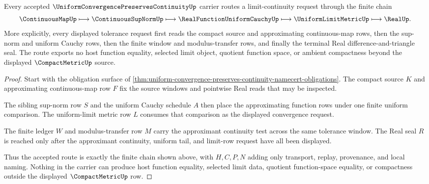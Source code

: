 \begin{theorem}
\label{thm:uniform-convergence-preserves-continuity-real-route}
Every accepted $\UniformConvergencePreservesContinuityUp$ carrier routes a limit-continuity request through the finite chain
$$
\ContinuousMapUp \longmapsto \ContinuousSupNormUp \longmapsto \RealFunctionUniformCauchyUp \longmapsto \UniformLimitMetricUp \longmapsto \RealUp .
$$
More explicitly, every displayed tolerance request first reads the compact source and approximating continuous-map rows, then the sup-norm and uniform Cauchy rows, then the finite window and modulus-transfer rows, and finally the terminal Real difference-and-triangle seal. The route exports no host function equality, selected limit object, quotient function space, or ambient compactness beyond the displayed $\CompactMetricUp$ source.
\end{theorem}
\begin{proof}
Start with the obligation surface of \autoref{thm:uniform-convergence-preserves-continuity-namecert-obligations}. The compact source $K$ and approximating continuous-map row $F$ fix the source windows and pointwise Real reads that may be inspected.

The sibling sup-norm row $S$ and the uniform Cauchy schedule $A$ then place the approximating function rows under one finite uniform comparison. The uniform-limit metric row $L$ consumes that comparison as the displayed convergence request.

The finite ledger $W$ and modulus-transfer row $M$ carry the approximant continuity test across the same tolerance window. The Real seal $R$ is reached only after the approximant continuity, uniform tail, and limit-row request have all been displayed.

Thus the accepted route is exactly the finite chain shown above, with $H,C,P,N$ adding only transport, replay, provenance, and local naming. Nothing in the carrier can produce host function equality, selected limit data, quotient function-space equality, or compactness outside the displayed $\CompactMetricUp$ row.
\end{proof}


